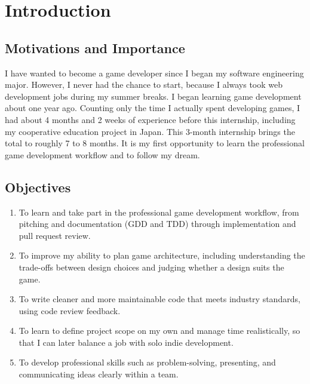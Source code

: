 
\chapter{Introduction}

\section{Motivations and Importance}
I have wanted to become a game developer since I began my software engineering major. However, I never had the chance to start, because I always took web development jobs during my summer breaks. I began learning game development about one year ago. Counting only the time I actually spent developing games, I had about 4 months and 2 weeks of experience before this internship, including my cooperative education project in Japan. This 3-month internship brings the total to roughly 7 to 8 months. It is my first opportunity to learn the professional game development workflow and to follow my dream.

\section{Objectives}
\begin{enumerate}[label=\arabic*.]
    \item To learn and take part in the professional game development workflow, from pitching and documentation (GDD and TDD) through implementation and pull request review.
    \item To improve my ability to plan game architecture, including understanding the trade-offs between design choices and judging whether a design suits the game.
    \item To write cleaner and more maintainable code that meets industry standards, using code review feedback.
    \item To learn to define project scope on my own and manage time realistically, so that I can later balance a job with solo indie development.
    \item To develop professional skills such as problem-solving, presenting, and communicating ideas clearly within a team.
\end{enumerate}

\newpage
